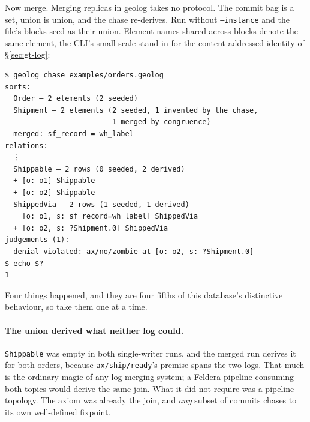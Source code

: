 Now merge. Merging replicas in geolog takes no protocol. The commit
bag is a set, union is union, and the chase re-derives. Run without
\texttt{--instance} and the file's blocks seed as their union. Element
names shared across blocks denote the same element, the CLI's
small-scale stand-in for the content-addressed identity of
\S\ref{sec:gt-log}:

\begin{Verbatim}[fontsize=\small,frame=leftline,rulecolor=\color{accentmid},framesep=3mm,xleftmargin=3mm]
$ geolog chase examples/orders.geolog
sorts:
  Order — 2 elements (2 seeded)
  Shipment — 2 elements (2 seeded, 1 invented by the chase,
                         1 merged by congruence)
  merged: sf_record = wh_label
relations:
  ⋮
  Shippable — 2 rows (0 seeded, 2 derived)
  + [o: o1] Shippable
  + [o: o2] Shippable
  ShippedVia — 2 rows (1 seeded, 1 derived)
    [o: o1, s: sf_record=wh_label] ShippedVia
  + [o: o2, s: ?Shipment.0] ShippedVia
judgements (1):
  denial violated: ax/no/zombie at [o: o2, s: ?Shipment.0]
$ echo $?
1
\end{Verbatim}

Four things happened, and they are four fifths of this database's
distinctive behaviour, so take them one at a time.

\paragraph{The union derived what neither log could.}
\texttt{Shippable} was empty in both single-writer runs, and the
merged run derives it for both orders, because
\texttt{ax/ship/ready}'s premise spans the two logs. That much is the
ordinary magic of any log-merging system; a Feldera pipeline consuming
both topics would derive the same join. What it did not require was a
pipeline topology. The axiom was already the join, and \emph{any}
subset of commits chases to its own well-defined fixpoint.

